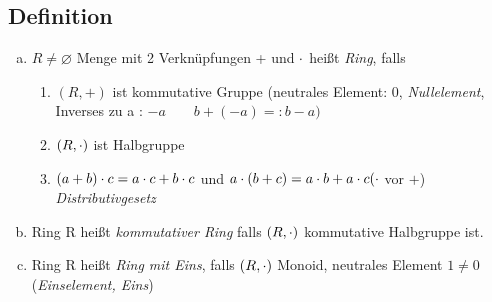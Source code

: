 \subsection{Definition}\label{sec:1.12}
\begin{enumerate}[a)]
\item$R \ne \varnothing$ Menge mit 2 Verknüpfungen + und $\cdot$ hei\ss t  \emph{Ring}, falls
\begin{enumerate}[(1)]
\item$ (R, +)$ ist kommutative Gruppe (neutrales Element: 0, \emph{Nullelement}, Inverses zu a : $-a\qquad b + (-a) =: b - a)$
\item $(R,\cdot)$ ist Halbgruppe
\item $(a+b) \cdot c = a \cdot c + b \cdot c$ und $a \cd (b + c) = a \cd b + a \cd c \hfill (\cd $ vor $+$)\\
\emph{Distributivgesetz} 
\end{enumerate}
\item Ring R hei\ss t \emph{kommutativer Ring} falls $(R,\cdot)$ kommutative Halbgruppe ist.
\item Ring R hei\ss t {\em Ring mit Eins}, falls $(R, \cdot)$ Monoid, neutrales Element $1 \ne 0$ ({\em Einselement, Eins})
\end{enumerate}
